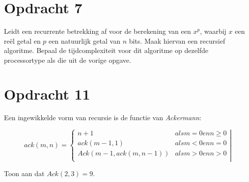\section{Opdracht 7}
Leidt een recurrente betrekking af voor de berekening van een $x^p$, waarbij  $x$ een re\"{e}l getal en $p$ een natuurlijk getal van $n$ bits. Maak hiervan een recursief algoritme. Bepaal de tijdcomplexiteit voor dit algoritme op dezelfde processortype als die uit de vorige opgave.

\section{Opdracht 11}
Een ingewikkelde vorm van recursie is de functie van \emph{Ackermann}:

\begin{displaymath}
ack(m,n)=\left\{ 
\begin{array}{ll}
n+1 & als m = 0 en n \geq 0\\
ack(m-1,1) & als m < 0 en n = 0\\
Ack(m-1, ack(m,n-1)) & als m > 0 en n > 0\\
\end{array}
\right|
\end{displaymath}

Toon aan dat $Ack(2,3)=9$.
